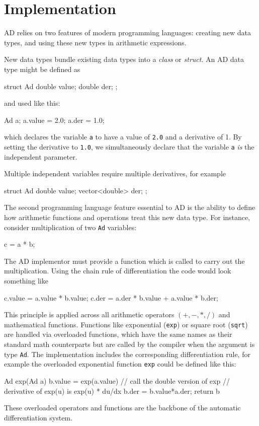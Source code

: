 \documentclass[10pt,openany,twoside]{book}
\numberwithin{equation}{section}   %
\newcommand{\Code}[1]{{\small\tt #1}}
\begin{document}
\section{Implementation}
AD relies on two features of modern programming languages: creating new
data types, and using these new types in arithmetic expressions.

New data types bundle existing data types into a \emph{class} or \emph{struct}.
An AD data type might be defined as
\begin{example}
   struct Ad {
      double value;
      double der;
   };
\end{example}
and used like this:
\begin{example}
   Ad a;
   a.value = 2.0;
   a.der = 1.0;
\end{example}
which declares the variable \Code{a} to have a value of \Code{2.0}
and a derivative of 1.  By setting the derivative
to \Code{1.0}, we simultaneously declare that the variable \Code{a} \emph{is}
the independent parameter.

Multiple independent variables require multiple derivatives, for example
\begin{example}
   struct Ad {
      double value;
      vector<double> der;
   };
\end{example}

The second programming language feature essential to AD is
the ability to define how arithmetic functions and operations treat this
new data type.
For instance, consider multiplication of two \Code{Ad} variables:
\begin{example}
   c = a * b;
\end{example}
The AD implementor must provide a function which is called to carry out
the multiplication. Using the chain rule of differentiation the code
would look something like
\begin{example}
   c.value = a.value * b.value;
   c.der = a.der * b.value + a.value * b.der;
\end{example}
This principle is applied across all arithmetic operators $(+,-,*,/)$
and mathematical functions. Functions like exponential (\Code{exp})
or square root (\Code{sqrt}) are handled via overloaded functions,
which have the same names as their standard math counterparts but
are called by the compiler when the argument is type \Code{Ad}.
The implementation includes the corresponding differentiation rule,
for example the overloaded exponential function \Code{exp}
could be defined like this:
\begin{example}
   Ad exp(Ad a) {
      b.value = exp(a.value)  // call the double version of exp
      // derivative of exp(u) is exp(u) * du/dx
      b.der = b.value*a.der;
      return b
   }
\end{example}
These overloaded operators and functions are the backbone of the
automatic differentiation system.
\end{document}
